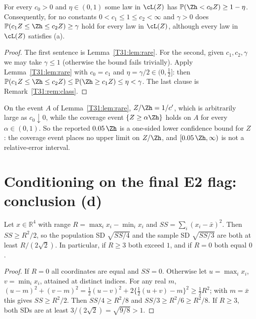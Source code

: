 \documentclass[11pt]{report}
\begin{document}
\begin{T31corollary}[Conclusion (c)]\label{T31:cor:c}
For every $c_0>0$ and $\eta\in(0,1)$ some law in $\cL(Z)$ has $\mathbb{P}(\Zh<c_0Z)\ge1-\eta$. Consequently, for no
constants $0<c_1\le1\le c_2<\infty$ and $\gamma>0$ does $\mathbb{P}(c_1Z\le\Zh\le c_2Z)\ge\gamma$ hold for every law in
$\cL(Z)$, although every law in $\cL(Z)$ satisfies (a).
\end{T31corollary}

\begin{proof}
The first sentence is Lemma~\ref{T31:lem:rare}. For the second, given $c_1,c_2,\gamma$ we may take $\gamma\le1$ (otherwise the
bound fails trivially). Apply Lemma~\ref{T31:lem:rare} with $c_0=c_1$ and $\eta=\gamma/2\in(0,\tfrac12]$: then
$\mathbb{P}(c_1Z\le\Zh\le c_2Z)\le\mathbb{P}(\Zh\ge c_1Z)\le\eta<\gamma$. The last clause is Remark~\ref{T31:rem:class}.
\end{proof}

\begin{T31remark}
On the event $A$ of Lemma~\ref{T31:lem:rare}, $Z/\Zh=1/c'$, which is arbitrarily large as $c_0\downarrow0$, while the coverage
event $\{Z\ge\alpha\Zh\}$ holds on $A$ for every $\alpha\in(0,1)$. So the reported $0.05\,\Zh$ is a one-sided lower
confidence bound for $Z$: the coverage event places no upper limit on $Z/\Zh$, and $[0.05\,\Zh,\infty)$ is not a
relative-error interval.
\end{T31remark}

\section{Conditioning on the final E2 flag: conclusion (d)}

\begin{T31lemma}\label{T31:lem:sd}
Let $x\in\mathbb{R}^4$ with range $R=\max_ix_i-\min_ix_i$ and $SS=\sum_i(x_i-\bar x)^2$. Then $SS\ge R^2/2$, so the
population SD $\sqrt{SS/4}$ and the sample SD $\sqrt{SS/3}$ are both at least $R/(2\sqrt2)$. In particular, if $R\ge3$
both exceed $1$, and if $R=0$ both equal $0$.
\end{T31lemma}

\begin{proof}
If $R=0$ all coordinates are equal and $SS=0$. Otherwise let $u=\max_ix_i$, $v=\min_ix_i$, attained at distinct indices.
For any real $m$, $(u-m)^2+(v-m)^2=\tfrac12(u-v)^2+2\{\tfrac12(u+v)-m\}^2\ge\tfrac12R^2$; with $m=\bar x$ this gives
$SS\ge R^2/2$. Then $SS/4\ge R^2/8$ and $SS/3\ge R^2/6\ge R^2/8$. If $R\ge3$, both SDs are at least
$3/(2\sqrt2)=\sqrt{9/8}>1$.
\end{proof}
\end{document}
